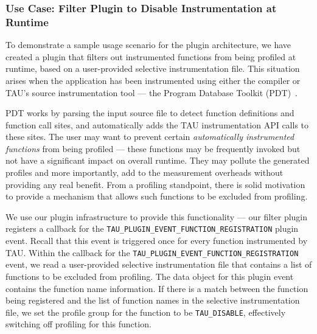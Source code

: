\subsubsection{Use Case: Filter Plugin to Disable Instrumentation at Runtime}
To demonstrate a sample usage scenario for the plugin architecture, we have created a plugin that filters out instrumented functions from being profiled at runtime, based on a user-provided selective instrumentation file. This situation arises when the application has been instrumented using either the compiler or TAU's source instrumentation tool --- the Program Database Toolkit (PDT)~\cite{PDT}.
\par PDT works by parsing the input source file to detect function definitions and function call sites, and automatically adds the TAU instrumentation API calls to these sites. The user may want to prevent certain \textit{automatically instrumented functions} from being profiled --- these functions may be frequently invoked but not have a significant impact on overall runtime. They may pollute the generated profiles and more importantly, add to the measurement overheads without providing any real benefit. From a profiling standpoint, there is solid motivation to provide a mechanism that allows such functions to be excluded from profiling.
\par We use our plugin infrastructure to provide this functionality --- our filter plugin registers a callback for the \verb+TAU_PLUGIN_EVENT_FUNCTION_REGISTRATION+ plugin event. Recall that this event is triggered once for every function instrumented by TAU. Within the callback for the \verb+TAU_PLUGIN_EVENT_FUNCTION_REGISTRATION+ event, we read a user-provided selective instrumentation file that contains a list of functions to be excluded from profiling. The data object for this plugin event contains the function name information. If there is a match between the function being registered and the list of function names in the selective instrumentation file, we set the profile group for the function to be \verb+TAU_DISABLE+, effectively switching off profiling for this function.

